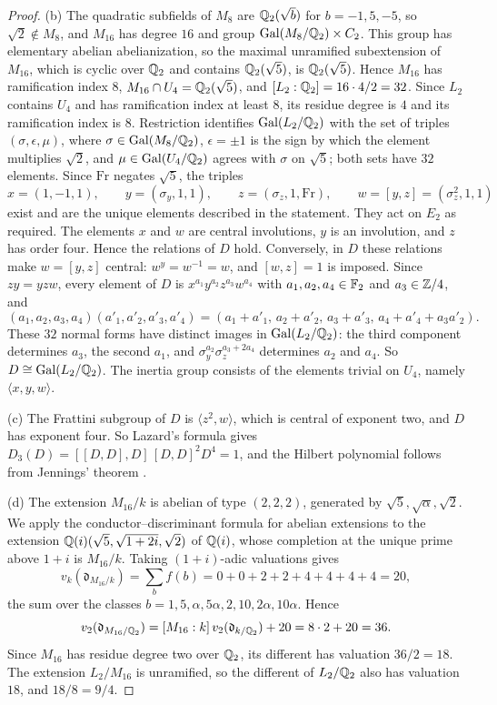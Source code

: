 \begin{proof}
(b) The quadratic subfields of $M_8$ are $\mathbb Q_2(\sqrt b)$ for $b=-1,5,-5$, so
$\sqrt2\notin M_8$, and $M_{16}$ has degree $16$ and group
$\operatorname{Gal}(M_8/\mathbb Q_2)\times C_2$. This group has elementary abelian
abelianization, so the maximal unramified subextension of $M_{16}$, which is
cyclic over $\mathbb Q_2$ and contains $\mathbb Q_2(\sqrt5)$, is $\mathbb Q_2(\sqrt5)$. Hence
$M_{16}$ has ramification index $8$, $M_{16}\cap U_4=\mathbb Q_2(\sqrt5)$, and
$[L_2:\mathbb Q_2]=16\cdot4/2=32$. Since $L_2$ contains $U_4$ and has ramification
index at least $8$, its residue degree is $4$ and its ramification index is
$8$. Restriction identifies $\operatorname{Gal}(L_2/\mathbb Q_2)$ with the set of triples
$(\sigma,\epsilon,\mu)$, where $\sigma\in\operatorname{Gal}(M_8/\mathbb Q_2)$, $\epsilon=\pm1$ is
the sign by which the element multiplies $\sqrt2$, and $\mu\in\operatorname{Gal}(U_4/\mathbb Q_2)$
agrees with $\sigma$ on $\sqrt5$; both sets have $32$ elements. Since $\mathrm{Fr}$
negates $\sqrt5$, the triples
\[
 x=(1,-1,1),\qquad y=(\sigma_y,1,1),\qquad z=(\sigma_z,1,\mathrm{Fr}),\qquad
 w=[y,z]=(\sigma_z^2,1,1)
\]
exist and are the unique elements described in the statement. They act on
$E_2$ as required. The elements $x$ and $w$ are central involutions, $y$ is
an involution, and $z$ has order four. Hence the relations of $D$ hold. Conversely, in
$D$ these relations make $w=[y,z]$ central: $w^y=w^{-1}=w$, and $[w,z]=1$ is
imposed. Since $zy=yzw$, every element of $D$ is
$x^{a_1}y^{a_2}z^{a_3}w^{a_4}$ with $a_1,a_2,a_4\in\mathbb F_2$ and
$a_3\in\mathbb Z/4$, and
\[
 (a_1,a_2,a_3,a_4)(a'_1,a'_2,a'_3,a'_4)
 =(a_1+a'_1,\,a_2+a'_2,\,a_3+a'_3,\,a_4+a'_4+a_3a'_2).
\]
These $32$ normal forms have distinct images in $\operatorname{Gal}(L_2/\mathbb Q_2)$: the third
component determines $a_3$, the second $a_1$, and
$\sigma_y^{a_2}\sigma_z^{a_3+2a_4}$ determines $a_2$ and $a_4$. So
$D\cong\operatorname{Gal}(L_2/\mathbb Q_2)$. The inertia group consists of the elements trivial
on $U_4$, namely $\langle x,y,w\rangle$.

(c) The Frattini subgroup of $D$ is $\langle z^2,w\rangle$, which is central
of exponent two, and $D$ has exponent four. So Lazard's formula gives
$D_3(D)=[[D,D],D]\,[D,D]^2D^4=1$, and the Hilbert polynomial follows from
Jennings' theorem \cite{Jennings}.

(d) The extension $M_{16}/k$ is abelian of type $(2,2,2)$, generated by
$\sqrt5,\sqrt\alpha,\sqrt2$. We apply the conductor--discriminant formula for
abelian extensions \cite[Chapter~V, Theorem~3.27]{MilneCFT} to the extension
$\mathbb Q(i)(\sqrt5,\sqrt{1+2i},\sqrt2)$ of $\mathbb Q(i)$, whose completion at the unique
prime above $1+i$ is $M_{16}/k$. Taking $(1+i)$-adic valuations gives
\[
 v_k(\mathfrak d_{M_{16}/k})=\sum_bf(b)=0+0+2+2+4+4+4+4=20,
\]
the sum over the classes $b=1,5,\alpha,5\alpha,2,10,2\alpha,10\alpha$. Hence
\[
 v_2(\mathfrak d_{M_{16}/\mathbb Q_2})=[M_{16}:k]\,v_2(\mathfrak d_{k/\mathbb Q_2})+20=8\cdot2+20=36.
\]
Since $M_{16}$ has residue degree two over $\mathbb Q_2$, its different has
valuation $36/2=18$. The extension $L_2/M_{16}$ is unramified, so the
different of $L_2/\mathbb Q_2$ also has valuation $18$, and $18/8=9/4$.
\end{proof}

